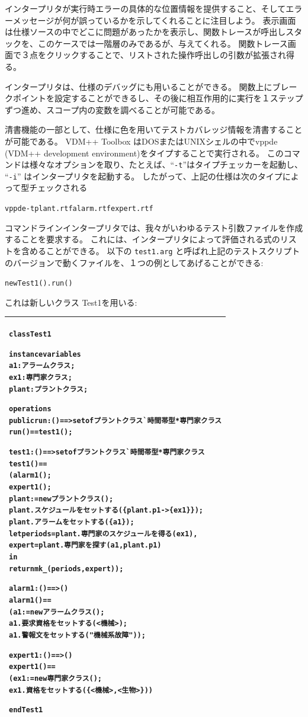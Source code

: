 \documentclass[\pformat,12pt,twoside]{jarticle}
\newenvironment{VDMgray}%
{\begin{tabular}{|G|}\hline\small\begin{alltt}}%
{\end{alltt}\normalsize\\
 \hline\end{tabular}}
\begin{document}
インタープリタが実行時エラーの具体的な位置情報を提供すること、そしてエラーメッセージが何が誤っているかを示してくれることに注目しよう。
表示画面は仕様ソースの中でどこに問題があったかを表示し、関数トレースが呼出しスタックを、このケースでは一階層のみであるが、与えてくれる。
関数トレース画面で３点をクリックすることで、リストされた操作呼出しの引数が拡張され得る。

インタープリタは、仕様のデバッグにも用いることができる。
関数上にブレークポイントを設定することができるし、その後に相互作用的に実行を１ステップずつ進め、スコープ内の変数を調べることが可能である。

清書機能の一部として、仕様に色を用いてテストカバレッジ情報を清書することが可能である。
VDM++ Toolbox はDOSまたはUNIXシェルの中でvppde (VDM++ development environment)をタイプすることで実行される。
このコマンドは様々なオプションを取り、たとえば、``\texttt{-t}''はタイプチェッカーを起動し、 ``\texttt{-i}'' はインタープリタを起動する。
したがって、上記の仕様は次のタイプによって型チェックされる

\small
\begin{alltt}
 vppde -t plant.rtf alarm.rtf expert.rtf
\end{alltt}
\normalsize

コマンドラインインタープリタでは、我々がいわゆるテスト引数ファイルを作成することを要求する。
これには、インタープリタによって評価される式のリストを含めることができる。
以下の \texttt{test1.arg} と呼ばれ上記のテストスクリプトのバージョンで動くファイルを、１つの例としてあげることができる:

\small
\begin{alltt}
 new Test1().run()
\end{alltt}
\normalsize

これは新しいクラス Test1を用いる:

\begin{VDMgray}
class Test1

instance variables
 a1 : アラームクラス;
 ex1 : 専門家クラス;
 plant : プラントクラス;

operations
 public run: () ==\texttt{>} set of プラントクラス\`{}時間帯型 * 専門家クラス
 run() == test1();

 test1: () ==\texttt{>} set of プラントクラス\`{}時間帯型 * 専門家クラス
 test1() ==
   (alarm1();
    expert1();
    plant:= new プラントクラス();
    plant.スケジュールをセットする(\{plant.p1 {\textbar}-\texttt{>} \{ex1\}\});
    plant.アラームをセットする(\{a1\});
    let periods = plant.専門家のスケジュールを得る(ex1),
        expert = plant.専門家を探す(a1,plant.p1)
    in 
      return mk\_(periods,expert));

 alarm1: () ==\texttt{>} ()
 alarm1() ==
   (a1:= new アラームクラス();
    a1.要求資格をセットする(\texttt{<}機械\texttt{>});
    a1.警報文をセットする("機械系故障"));

 expert1: () ==\texttt{>} ()
 expert1() ==
   (ex1:= new 専門家クラス();
    ex1.資格をセットする(\{\texttt{<}機械\texttt{>},\texttt{<}生物\texttt{>}\}))

end Test1

\end{VDMgray}
\end{document}
